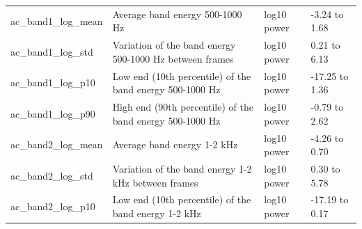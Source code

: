 \documentclass[11pt,a4paper]{article}
\begin{document}
\begin{center}
\begin{longtable}{>{\raggedright\arraybackslash}p{3.70cm}>{\raggedright\arraybackslash}p{6.65cm}>{\raggedright\arraybackslash}p{1.90cm}>{\raggedright\arraybackslash}p{2.56cm}}
\hspace{0pt}ac\_\allowbreak{}band1\_\allowbreak{}log\_\allowbreak{}mean & \hspace{0pt}Average band energy 500-1000 Hz & \hspace{0pt}log10 power & \hspace{0pt}-3.24 to 1.68\\
\hspace{0pt}ac\_\allowbreak{}band1\_\allowbreak{}log\_\allowbreak{}std & \hspace{0pt}Variation of the band energy 500-1000 Hz between frames & \hspace{0pt}log10 power & \hspace{0pt}0.21 to 6.13\\
\hspace{0pt}ac\_\allowbreak{}band1\_\allowbreak{}log\_\allowbreak{}p10 & \hspace{0pt}Low end (10th percentile) of the band energy 500-1000 Hz & \hspace{0pt}log10 power & \hspace{0pt}-17.25 to 1.36\\
\hspace{0pt}ac\_\allowbreak{}band1\_\allowbreak{}log\_\allowbreak{}p90 & \hspace{0pt}High end (90th percentile) of the band energy 500-1000 Hz & \hspace{0pt}log10 power & \hspace{0pt}-0.79 to 2.62\\
\hspace{0pt}ac\_\allowbreak{}band2\_\allowbreak{}log\_\allowbreak{}mean & \hspace{0pt}Average band energy 1-2 kHz & \hspace{0pt}log10 power & \hspace{0pt}-4.26 to 0.70\\
\hspace{0pt}ac\_\allowbreak{}band2\_\allowbreak{}log\_\allowbreak{}std & \hspace{0pt}Variation of the band energy 1-2 kHz between frames & \hspace{0pt}log10 power & \hspace{0pt}0.30 to 5.78\\
\hspace{0pt}ac\_\allowbreak{}band2\_\allowbreak{}log\_\allowbreak{}p10 & \hspace{0pt}Low end (10th percentile) of the band energy 1-2 kHz & \hspace{0pt}log10 power & \hspace{0pt}-17.19 to 0.17\\

\end{longtable}
\end{center}
\end{document}

